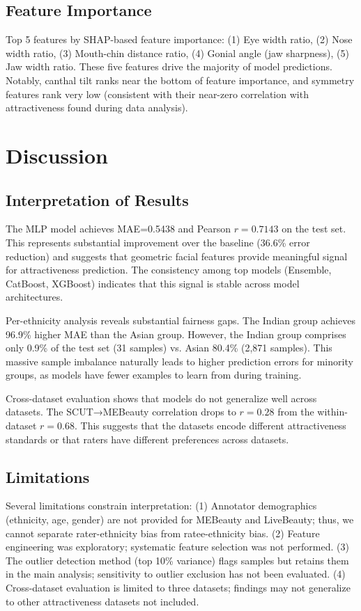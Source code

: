 \documentclass[a4paper,oneside,bibliography=totoc]{scrbook}
\begin{document}
\section{Feature Importance}

Top 5 features by SHAP-based feature importance: (1) Eye width ratio, (2) Nose width ratio, (3) Mouth-chin distance ratio, (4) Gonial angle (jaw sharpness), (5) Jaw width ratio. These five features drive the majority of model predictions. Notably, canthal tilt ranks near the bottom of feature importance, and symmetry features rank very low (consistent with their near-zero correlation with attractiveness found during data analysis).

\chapter{Discussion}

\section{Interpretation of Results}

The MLP model achieves MAE=0.5438 and Pearson $r=0.7143$ on the test set. This represents substantial improvement over the baseline (36.6\% error reduction) and suggests that geometric facial features provide meaningful signal for attractiveness prediction. The consistency among top models (Ensemble, CatBoost, XGBoost) indicates that this signal is stable across model architectures.

Per-ethnicity analysis reveals substantial fairness gaps. The Indian group achieves 96.9\% higher MAE than the Asian group. However, the Indian group comprises only 0.9\% of the test set (31 samples) vs. Asian 80.4\% (2,871 samples). This massive sample imbalance naturally leads to higher prediction errors for minority groups, as models have fewer examples to learn from during training.

Cross-dataset evaluation shows that models do not generalize well across datasets. The SCUT→MEBeauty correlation drops to $r=0.28$ from the within-dataset $r=0.68$. This suggests that the datasets encode different attractiveness standards or that raters have different preferences across datasets.

\section{Limitations}

Several limitations constrain interpretation: (1) Annotator demographics (ethnicity, age, gender) are not provided for MEBeauty and LiveBeauty; thus, we cannot separate rater-ethnicity bias from ratee-ethnicity bias. (2) Feature engineering was exploratory; systematic feature selection was not performed. (3) The outlier detection method (top 10\% variance) flags samples but retains them in the main analysis; sensitivity to outlier exclusion has not been evaluated. (4) Cross-dataset evaluation is limited to three datasets; findings may not generalize to other attractiveness datasets not included.
\end{document}
